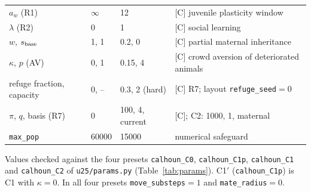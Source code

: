 {\begin{longtable}{@{}p{}p{}p{}p{}@{}}
$a_w$ (R1) & $\infty$ & 12 & [C] juvenile plasticity window \\
$\lambda$ (R2) & 0 & 1 & [C] social learning \\
$w$, $s_{\rm base}$ & 1, 1 & 0.2, 0 & [C] partial maternal inheritance \\
$\kappa$, $p$ (AV) & 0, 1 & 0.15, 4 & [C] crowd aversion of deteriorated animals \\
refuge fraction, capacity & 0, -- & 0.3, 2 (hard) & [C] R7; layout \texttt{refuge\_seed}${}=0$ \\
$\pi$, $q$, basis (R7) & 0 & 100, 4, current & [C]; \textsf{C2}: 1000, 1, maternal \\
\texttt{max\_pop} & 60000 & 15000 & numerical safeguard \\
\end{longtable}
}
Values checked against the four presets \texttt{calhoun\_C0}, \texttt{calhoun\_C1p}, \texttt{calhoun\_C1} and
\texttt{calhoun\_C2} of \texttt{u25/params.py} (Table~\ref{tab:params}). \textsf{C1}$'$ (\texttt{calhoun\_C1p}) is
\textsf{C1} with $\kappa=0$. In all four presets \texttt{move\_substeps}${}=1$ and \texttt{mate\_radius}${}=0$.

